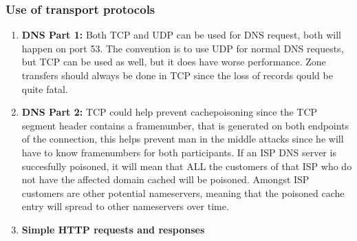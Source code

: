 \documentclass[10pt]{article}
\begin{document}
\subsubsection{Use of transport protocols}
\begin{enumerate}
  \item \textbf{DNS Part 1:} Both TCP and UDP can be used for DNS request, both
        will happen on port 53. The convention is to use UDP for normal DNS
        requests, but TCP can be used as well, but it does have worse
        performance. Zone transfers should always be done in TCP since the loss
        of records qould be quite fatal.
  \item \textbf{DNS Part 2:} TCP could help prevent cachepoisoning since the TCP
        segment header contains a framenumber, that is generated on both
        endpoints of the connection, this helps prevent man in the middle
        attacks since he will have to know framenumbers for both participants.
        If an ISP DNS server is succesfully poisoned, it will mean that ALL the
        customers of that ISP who do not have the affected domain cached will be
        poisoned. Amongst ISP customers are other potential nameservers, meaning
        that the poisoned cache entry will spread to other nameservers over
        time.
  \item \textbf{Simple HTTP requests and responses}
\end{enumerate}
\end{document}
